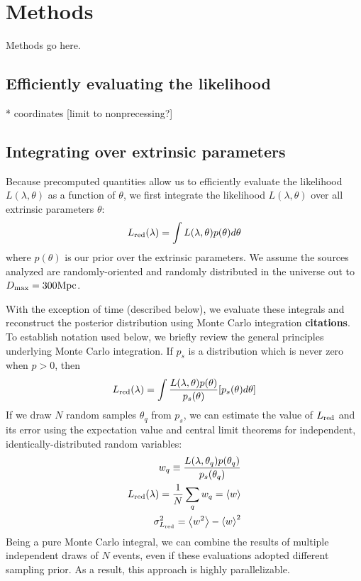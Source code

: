 \documentclass[twocolumn,prd,nofootinbib]{revtex4}
\newcommand\unit[1]{{\rm #1}}
\begin{document}
\section{Methods}

Methods go here.

\subsection{Efficiently evaluating the likelihood}

* coordinates [limit to nonprecessing?]

\subsection{Integrating over extrinsic parameters}

Because precomputed quantities allow us to efficiently evaluate the likelihood $L(\lambda,\theta)$ as a function of
$\theta$, we first integrate the likelihood $L(\lambda,\theta)$ over all extrinsic parameters $\theta$:
\begin{eqnarray}
L_{\rm red}(\lambda) = \int L(\lambda,\theta) p(\theta) d\theta
\end{eqnarray}
where $p(\theta)$ is our prior over the extrinsic  parameters.  We assume the sources analyzed are randomly-oriented and
randomly distributed in the universe out to $D_{\rm max}=300 \unit{Mpc}$.  

With the exception of time (described below), we evaluate these integrals and reconstruct the posterior distribution using Monte Carlo integration
\textbf{citations}.   To establish notation used below, we briefly review the general principles  underlying Monte Carlo
integration.  If $p_s$ is a distribution which is never zero when $p>0$, then 
\begin{eqnarray}
L_{\rm red}(\lambda) = \int \frac{L(\lambda,\theta) p(\theta)}{p_s(\theta)} [p_s(\theta) d\theta]
\end{eqnarray}
% 
If we draw $N$ random samples $\theta_q$ from $p_s$, we can estimate the value of $L_{\rm red}$ and its error using the
expectation value and central limit theorems for independent, identically-distributed random variables:
\begin{eqnarray}
w_q \equiv \frac{L(\lambda,\theta_q) p(\theta_q)}{p_s(\theta_q)} \\
L_{\rm red}(\lambda) = \frac{1}{N} \sum_q w_q = \left<w\right> \\
\sigma_{L_{\rm red}}^2 = \left<w^2\right> - \left<w\right>^2
\end{eqnarray}
Being a pure Monte Carlo integral, we can  combine the results of multiple independent draws of $N$ events, even if these
evaluations adopted different sampling prior.  As a result, this approach is highly parallelizable.  
\end{document}
